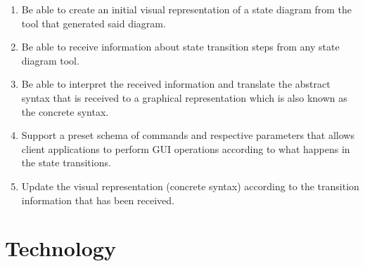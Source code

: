 \documentclass[11pt,a4paper]{article}
\begin{document}
\begin{enumerate}
	\item Be able to create an initial visual representation of a state diagram from the tool that generated said diagram.
	\item Be able to receive information about state transition steps from any state diagram tool.
	\item Be able to interpret the received information and translate the abstract syntax that is received to a graphical representation which is also known as the concrete syntax.
	\item Support a preset schema of commands and respective parameters that allows client applications to perform GUI operations according to what happens in the state transitions.
	\item Update the visual representation (concrete syntax) according to the transition information that has been received.
\end{enumerate}

\section{Technology}
\end{document}
